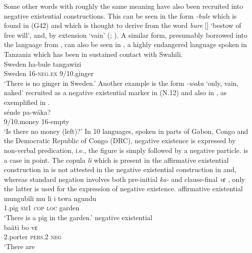 \documentclass[output=paper]{langscibook}
\begin{document}
%
Some other words with
roughly the same meaning have also been recruited into negative existential
constructions. This can be seen in the form \textit{-bule} which is found
in  (G42) and which is thought to derive from the 
word \textit{bure} [] `bestow of free will', and, by extension
`vain' (\citealt[42]{Johnson1939}; \citealt[48]{TUKI2014}). A similar form,
presumably borrowed into the language from , can also be seen in
, a highly endangered language spoken in Tanzania which has been
in sustained contact with Swahili.  \ea\label{ex:kami-sweden}
\\ \gll Sweden ha-bule
tangawizi\\ Sweden 16-\textsc{neg.ex} 9/10.ginger\\ \glt `There is no
ginger in Sweden.' \z Another example is the form \textit{-waka} `only,
vain, naked' recruited as a negative existential marker in 
(N.12) and also in , as exemplified in .
\ea\label{ex:manda-money} \\ \gll s{\'e}nde pa-w{\'a}ka? \\ 9/10.money
16-empty\\ \glt `Is there no money (left)?' \z 
%
In 10 languages, spoken in parts of Gabon, Congo and the Democratic
Republic of Congo (DRC), negative existence is expressed by non-verbal
predication, i.e., the figure is simply followed by a negative particle.
 is a case in point.  The copula \textit{li} which is present in
the affirmative existential construction in  is not
attested in the negative existential construction in 
and, whereas standard negation involves both pre-initial \textit{ka-} and
clause-final \textit{vɛ} , only the latter is used for
the expression of negative existence.  
%
\ea\label{ex:duma-pig-porter-kill} 
\ea\label{ex:duma-pig} affirmative existential \citep[148]{Adam1954}\\ 
\gll mungubili mu li i {tswa ngundu}\\ 
1.pig \textsc{sm1} \textsc{cop} \textsc{loc} garden\\ 
\glt	`There is a pig in the garden.'
\ex\label{ex:duma-porter} negative existential \citep[148]{Adam1954}\\ \gll
ba{\~a}ti bo vɛ\\ 2.porter \textsc{pers}.2 \textsc{neg}\\ \glt 	`There are
\end{document}
